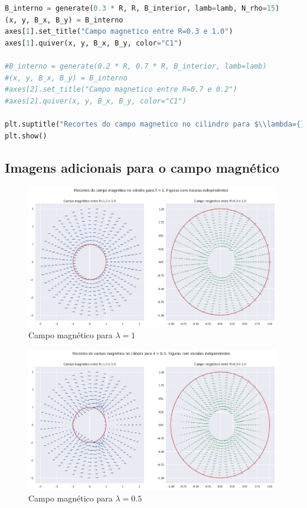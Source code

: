 \documentclass[%
 reprint,
 amsmath,amssymb,
 aps,
]{revtex4-1}
\begin{document}
\begin{tiny}
\begin{lstlisting}[language=Python]
B_interno = generate(0.3 * R, R, B_interior, lamb=lamb, N_rho=15)
(x, y, B_x, B_y) = B_interno
axes[1].set_title("Campo magnetico entre R=0.3 e 1.0")
axes[1].quiver(x, y, B_x, B_y, color="C1")

#B_interno = generate(0.2 * R, 0.7 * R, B_interior, lamb=lamb)
#(x, y, B_x, B_y) = B_interno
#axes[2].set_title("Campo magnetico entre R=0.7 e 0.2")
#axes[2].quiver(x, y, B_x, B_y, color="C1")

plt.suptitle("Recortes do campo magnetico no cilindro para $\\lambda={}$. Figuras com escalas independentes".format(lamb))
plt.show()
\end{lstlisting}
\end{tiny}

\subsection{Imagens adicionais para o campo magnético}

\begin{figure}[h]
    \caption{Campo magnético para $\lambda=1$}
    \includegraphics[width=0.99\textwidth]{lambda_1.png}
\end{figure}

\begin{figure}[h]
    \caption{Campo magnético para $\lambda=0.5$}
    \includegraphics[width=0.99\textwidth]{lambda_05.png}
\end{figure}
\end{document}
